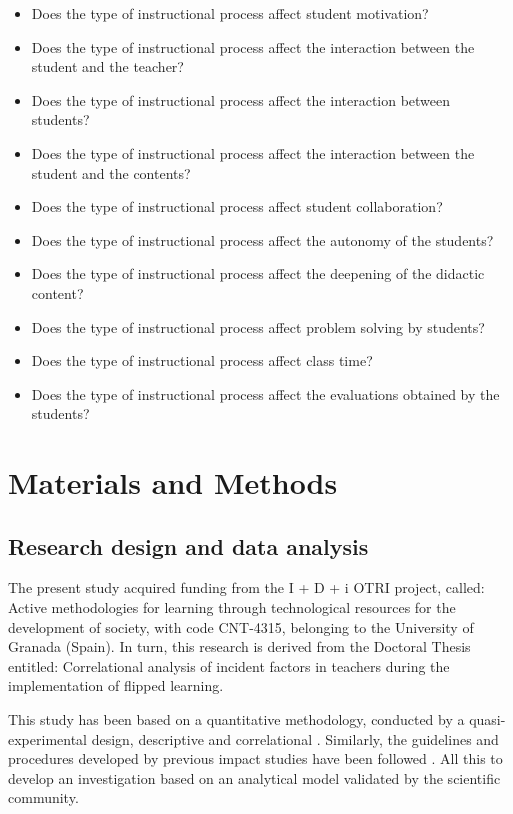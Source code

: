 \documentclass{textolivre}
\begin{document}
\begin{itemize}
    \item Does the type of instructional process affect student motivation?
    \item Does the type of instructional process affect the interaction between the student and the teacher?
    \item Does the type of instructional process affect the interaction between students?
    \item Does the type of instructional process affect the interaction between the student and the contents?
    \item Does the type of instructional process affect student collaboration?
    \item Does the type of instructional process affect the autonomy of the students?
    \item Does the type of instructional process affect the deepening of the didactic content?
    \item Does the type of instructional process affect problem solving by students?
    \item Does the type of instructional process affect class time?
    \item Does the type of instructional process affect the evaluations obtained by the students?
\end{itemize}

\section{Materials and Methods}
\subsection{Research design and data analysis}
The present study acquired funding from the I + D + i OTRI project, called: Active methodologies for learning through technological resources for the development of society, with code CNT-4315, belonging to the University of Granada (Spain). In turn, this research is derived from the Doctoral Thesis entitled: Correlational analysis of incident factors in teachers during the implementation of flipped learning.

This study has been based on a quantitative methodology, conducted by a quasi-experimental design, descriptive and correlational \cite{hernandezfernandezbaptista2014, rodriguez2011}. Similarly, the guidelines and procedures developed by previous impact studies have been followed \cite{lopeznunez+lopezbelmonte+morenoguerrero+pozosanchez2020}. %
All this to develop an investigation based on an analytical model validated by the scientific community.
\end{document}
